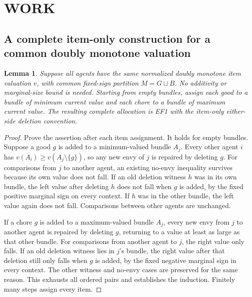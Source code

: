 \documentclass[11pt,a4paper]{article}
\newtheorem{lemma}[theorem]{Lemma}
\theoremstyle{remark}\newtheorem{remark}[theorem]{Remark}
\begin{document}
\section{WORK}

\subsection{A complete item-only construction for a common doubly monotone valuation}
\begin{lemma}\label{lem:commonEF1}
Suppose all agents have the same normalized doubly monotone item valuation $v$, with common fixed-sign partition $M=G\sqcup B$. No additivity or marginal-size bound is needed. Starting from empty bundles, assign each good to a bundle of minimum current value and each chore to a bundle of maximum current value. The resulting complete allocation is EF1 with the item-only either-side deletion convention.
\end{lemma}
\begin{proof}
Prove the assertion after each item assignment. It holds for empty bundles. Suppose a good $g$ is added to a minimum-valued bundle $A_j$. Every other agent $i$ has $v(A_i)\ge v(A_j\setminus\{g\})$, so any new envy of $j$ is repaired by deleting $g$. For comparisons from $j$ to another agent, an existing no-envy inequality survives because its own value does not fall. If an old deletion witness $h$ was in its own bundle, the left value after deleting $h$ does not fall when $g$ is added, by the fixed positive marginal sign on every context. If $h$ was in the other bundle, the left value again does not fall. Comparisons between other agents are unchanged.

If a chore $g$ is added to a maximum-valued bundle $A_j$, every new envy from $j$ to another agent is repaired by deleting $g$, returning to a value at least as large as that other bundle. For comparisons from another agent to $j$, the right value only falls. If an old deletion witness lies in $j$'s bundle, the right value after that deletion still only falls when $g$ is added, by the fixed negative marginal sign in every context. The other witness and no-envy cases are preserved for the same reason. This exhausts all ordered pairs and establishes the induction. Finitely many steps assign every item.
\end{proof}
\end{document}
